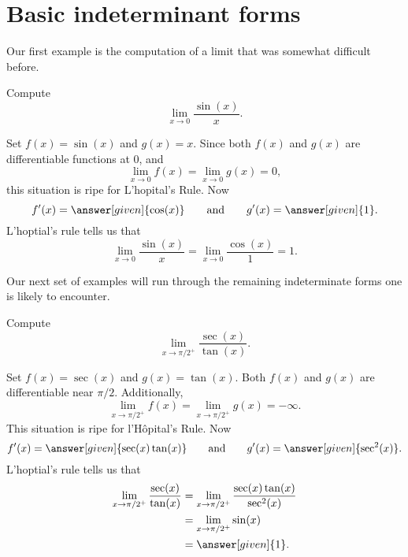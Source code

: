\documentclass{ximera}
\begin{document}
\section{Basic indeterminant forms}


Our first example is the computation of a limit that was somewhat
difficult before.

\begin{example}
Compute
\[
\lim_{x\to 0} \frac{\sin(x)}{x}.
\]
\begin{explanation}
Set $f(x) = \sin(x)$ and $g(x) = x$.  Since both $f(x)$ and $g(x)$ are
differentiable functions at $0$, and 
\[
\lim_{x \to 0} f(x) = \lim_{x \to 0}g(x) = 0,
\]
this situation is ripe for L'hopital's Rule. Now
\[
f'(x) = \answer[given]{\cos(x)} \qquad\text{and}\qquad g'(x) = \answer[given]{1}.
\] 
L'hoptial's rule tells us that 
\[
\lim_{x \to 0} \frac{\sin(x)}{x} = \lim_{x \to 0} \frac{\cos(x)}{1} = 1.
\]
\end{explanation}
\end{example}


Our next set of examples will run through the remaining indeterminate
forms one is likely to encounter.

\begin{example}
  Compute 
\[
\lim_{x\to \pi/2^+} \frac{\sec(x)}{\tan(x)}.
\]
\begin{explanation}
Set $f(x) = \sec(x)$ and $g(x) = \tan(x)$. Both $f(x)$ and $g(x)$
are differentiable near $\pi/2$. Additionally,
\[
\lim_{x \to \pi/2^+} f(x) = \lim_{x \to \pi/2^+}g(x) = -\infty.
\]
This situation is ripe for l'H\^opital's Rule. Now 
\[
f'(x) = \answer[given]{\sec(x)\tan(x)} \qquad\text{and}\qquad g'(x) = \answer[given]{\sec^2(x)}.
\]
L'hoptial's rule tells us that 
\begin{align*}
\lim_{x\to \pi/2^+} \frac{\sec(x)}{\tan(x)} &= \lim_{x\to \pi/2^+}
\frac{\sec(x)\tan(x)}{\sec^2(x)} \\
&= \lim_{x\to \pi/2^+} \sin(x)\\
&=\answer[given]{1}.
\end{align*}
\end{explanation}
\end{example}
\end{document}
